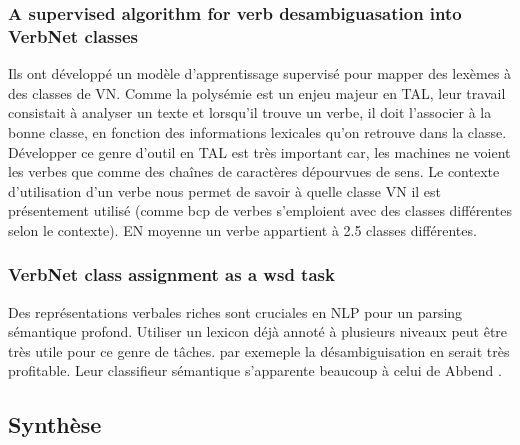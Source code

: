 \subsubsection{A supervised algorithm for verb desambiguasation into VerbNet classes}
\citep{AbendSupervisedAlgorithmVerb2008}
Ils ont développé un modèle d'apprentissage supervisé pour mapper des lexèmes à des classes de VN. Comme la polysémie est un enjeu majeur en TAL, leur travail consistait à analyser un texte et lorsqu'il trouve un verbe, il doit l'associer à la bonne classe, en fonction des informations lexicales qu'on retrouve dans la classe. Développer ce genre d'outil en TAL est très important car, les machines ne voient les verbes que comme des chaînes de caractères dépourvues de sens. Le contexte d'utilisation d'un verbe nous permet de savoir à quelle classe VN il est présentement utilisé (comme bcp de verbes s'emploient avec des classes différentes selon le contexte). EN moyenne un verbe appartient à 2.5 classes différentes.

\subsubsection{VerbNet class assignment as a wsd task}
\citep{BrownVerbNetClassAssignment2011}
Des représentations verbales riches sont cruciales en NLP pour un parsing sémantique profond. Utiliser un lexicon déjà annoté à plusieurs niveaux peut être très utile pour ce genre de tâches. par exemeple la désambiguisation en serait très profitable. Leur classifieur sémantique s'apparente beaucoup à celui de Abbend \citep{AbendSupervisedAlgorithmVerb2008}.

\subsection{Synthèse}

